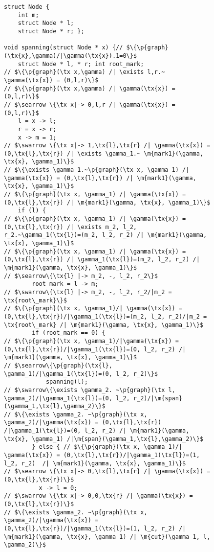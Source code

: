 \documentclass{article}
\newcommand{\tx}[1]{\text{#1}}
\newcommand{\p}[1]{\ensuremath{\mathsf{#1}}} %
\newcommand{\m}[1]{\ensuremath{\mathit{#1}}} %
\begin{document}
\begin{figure}[t]
\begin{lstlisting}
struct Node {
    int m;
    struct Node * l;
    struct Node * r; };

void spanning(struct Node * x) {// $\{\p{graph}(\tx{x},\gamma)/|\gamma(\tx{x}).1=0\}$
    struct Node * l, * r; int root_mark;
// $\{\p{graph}(\tx x,\gamma) /| \exists l,r.~ \gamma(\tx{x}) = (0,l,r)\}$
// $\{\p{graph}(\tx x,\gamma) /| \gamma(\tx{x}) = (0,l,r)\}$
// $\searrow \{\tx x|-> 0,l,r /| \gamma(\tx{x}) = (0,l,r)\}$
    l = x -> l;
    r = x -> r;
    x -> m = 1;
// $\swarrow \{\tx x|-> 1,\tx{l},\tx{r} /| \gamma(\tx{x}) = (0,\tx{l},\tx{r}) /| \exists \gamma_1.~ \m{mark1}(\gamma, \tx{x}, \gamma_1)\}$
// $\{\exists \gamma_1.~\p{graph}(\tx x, \gamma_1) /| \gamma(\tx{x}) = (0,\tx{l},\tx{r}) /| \m{mark1}(\gamma, \tx{x}, \gamma_1)\}$
// $\{\p{graph}(\tx x, \gamma_1) /| \gamma(\tx{x}) = (0,\tx{l},\tx{r}) /| \m{mark1}(\gamma, \tx{x}, \gamma_1)\}$
    if (l) {
// $\{\p{graph}(\tx x, \gamma_1) /| \gamma(\tx{x}) = (0,\tx{l},\tx{r}) /| \exists m_2, l_2, r_2.~\gamma_1(\tx{l})=(m_2, l_2, r_2) /| \m{mark1}(\gamma, \tx{x}, \gamma_1)\}$
// $\{\p{graph}(\tx x, \gamma_1) /| \gamma(\tx{x}) = (0,\tx{l},\tx{r}) /| \gamma_1(\tx{l})=(m_2, l_2, r_2) /| \m{mark1}(\gamma, \tx{x}, \gamma_1)\}$
// $\searrow\{\tx{l} |-> m_2, -, l_2, r_2\}$
        root_mark = l -> m;
// $\swarrow\{\tx{l} |-> m_2, -, l_2, r_2/|m_2 = \tx{root\_mark}\}$
// $\{\p{graph}(\tx x, \gamma_1)/| \gamma(\tx{x}) = (0,\tx{l},\tx{r})/|\gamma_1(\tx{l})=(m_2, l_2, r_2)/|m_2 = \tx{root\_mark} /| \m{mark1}(\gamma, \tx{x}, \gamma_1)\}$
        if (root_mark == 0) {
// $\{\p{graph}(\tx x, \gamma_1)/|\gamma(\tx{x}) = (0,\tx{l},\tx{r})/|\gamma_1(\tx{l})=(0, l_2, r_2) /| \m{mark1}(\gamma, \tx{x}, \gamma_1)\}$
// $\searrow\{\p{graph}(\tx{l}, \gamma_1)/|\gamma_1(\tx{l})=(0, l_2, r_2)\}$
            spanning(l);
// $\swarrow\{\exists \gamma_2. ~\p{graph}(\tx l, \gamma_2)/|\gamma_1(\tx{l})=(0, l_2, r_2)/|\m{span}(\gamma_1,\tx{l},\gamma_2)\}$
// $\{\exists \gamma_2. ~\p{graph}(\tx x, \gamma_2)/|\gamma(\tx{x}) = (0,\tx{l},\tx{r}) /|\gamma_1(\tx{l})=(0, l_2, r_2) /| \m{mark1}(\gamma, \tx{x}, \gamma_1) /|\m{span}(\gamma_1,\tx{l},\gamma_2)\}$
        } else { // $\{\p{graph}(\tx x, \gamma_1)/| \gamma(\tx{x}) = (0,\tx{l},\tx{r})/|\gamma_1(\tx{l})=(1, l_2, r_2)  /| \m{mark1}(\gamma, \tx{x}, \gamma_1)\}$
// $\searrow \{\tx x|-> 0,\tx{l},\tx{r} /| \gamma(\tx{x}) = (0,\tx{l},\tx{r})\}$
          x -> l = 0;
// $\swarrow \{\tx x|-> 0,0,\tx{r} /| \gamma(\tx{x}) = (0,\tx{l},\tx{r})\}$
// $\{\exists \gamma_2. ~\p{graph}(\tx x, \gamma_2)/|\gamma(\tx{x}) = (0,\tx{l},\tx{r})/|\gamma_1(\tx{l})=(1, l_2, r_2) /| \m{mark1}(\gamma, \tx{x}, \gamma_1) /| \m{cut}(\gamma_1, l, \gamma_2)\}$

\end{lstlisting}
\end{figure}
\end{document}
